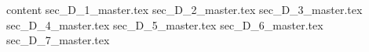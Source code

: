 {content}
{sec_D_1_master.tex}
{sec_D_2_master.tex}
{sec_D_3_master.tex}
{sec_D_4_master.tex}
{sec_D_5_master.tex}
{sec_D_6_master.tex}
{sec_D_7_master.tex} 